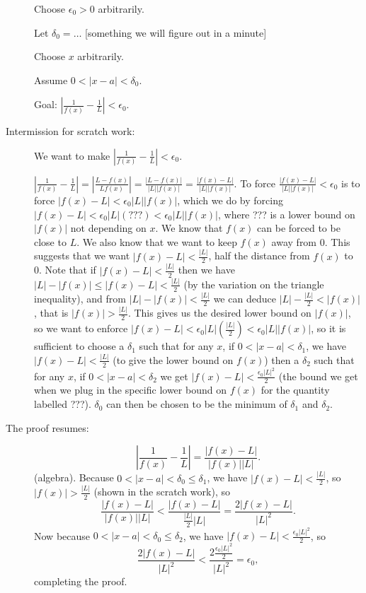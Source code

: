 \documentclass[12pt]{article}
\begin{document}
\begin{description}
Choose $\epsilon_0>0$ arbitrarily.

Let $\delta_0 =\ldots$  [something we will figure out in a minute]

Choose $x$ arbitrarily.

Assume $0<|x-a|<\delta_0$.

Goal:  $|\frac1{f(x)}-\frac1L|<\epsilon_0$.

\item[Intermission for scratch work:]

We want to make $|\frac1{f(x)}-\frac1L|<\epsilon_0$.

$|\frac1{f(x)}-\frac1L|=|\frac{L-f(x)}{Lf(x)}| = \frac{|L-f(x)|}{|L||f(x)|} = \frac{|f(x)-L|}{|L||f(x)|}$.  To force $\frac{|f(x)-L|}{|L||f(x)|}<\epsilon_0$ is to force
$|f(x)-L|<\epsilon_0|L||f(x)|$, which we do by forcing $|f(x)-L|<\epsilon_0|L|(???)<\epsilon_0|L||f(x)|$, where ??? is a lower bound on $|f(x)|$ not depending on $x$.  We know that $f(x)$ can be forced to be close to $L$.  We also know that
we want to keep $f(x)$ away from 0.  This suggests that we want $|f(x)-L|<\frac{|L|}2$, half the distance from $f(x)$ to 0.  Note that if $|f(x)-L|<\frac{|L|}2$
then we have $|L|-|f(x)| \leq |f(x)-L| < \frac{|L|}2$ (by the variation on the triangle inequality), and from $|L|-|f(x)|<\frac{|L|}2$ we can deduce $|L|-\frac{|L|}2<|f(x)|$, that is $|f(x)|>\frac{|L|}2$.  This gives us the desired lower bound on $|f(x)|$, so we want to enforce $|f(x)-L|<\epsilon_0|L|(\frac{|L|}2)<\epsilon_0|L||f(x)|$, so it is sufficient to choose a $\delta_1$ such that for any $x$, if $0<|x-a|<\delta_1$, we have $|f(x)-L|<\frac{|L|}2$ (to give the lower bound on $f(x)$) then a $\delta_2$ such that for any $x$, if $0<|x-a|<\delta_2$ we get $|f(x)-L|<\frac{\epsilon_0|L|^2}2$ (the bound we get when we plug in the specific lower bound on $f(x)$ for the quantity labelled ???).  $\delta_0$ can then be chosen to be the minimum of $\delta_1$ and $\delta_2$.

\item[The proof resumes:]

$$|\frac 1{f(x)}-\frac1L|=\frac{|f(x)-L|}{|f(x)||L|}.$$ (algebra).  Because $0<|x-a|<\delta_0 \leq \delta_1$, we have
$|f(x)-L|<\frac{|L|}2$, so $|f(x)|>\frac{|L|}2$ (shown in the scratch work), so $$\frac{|f(x)-L|}{|f(x)||L|}<\frac{|f(x)-L|}{\frac{|L|}2|L|}=\frac{2|f(x)-L|}{|L|^2}.$$  Now because $0<|x-a|<\delta_0\leq \delta_2$, we have
$|f(x)-L|<\frac{\epsilon_0|L|^2}2$, so $$\frac{2|f(x)-L|}{|L|^2}<\frac{2\frac{\epsilon_0|L|^2}2}{|L|^2}=\epsilon_0,$$ completing the proof.

\end{description}
\end{document}
